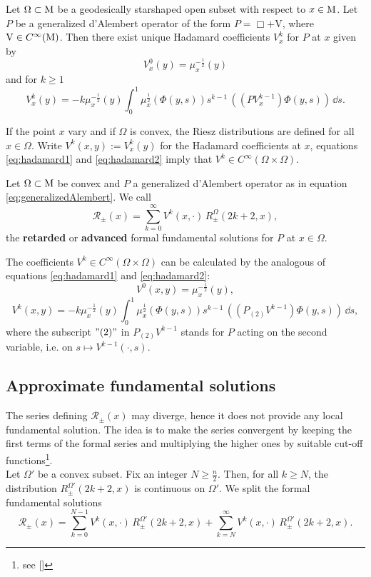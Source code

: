 \begin{theorem}
	Let $\Omega\subset\mathrm{M}$ be a geodesically starshaped open subset with respect to $x\in\mathrm{M}$. Let $P$ be a generalized d'Alembert operator of the form $P=\Box+\mathrm{V}$, where $\mathrm{V}\in C^\infty(\mathrm{M})$. Then there exist unique Hadamard coefficients $V_x^k$ for $P$ at $x$ given by
	\begin{equation}
		V_x^0(y)=\mu_x^{-\frac12}(y)
		\label{eq:hadamard1}
	\end{equation}	
	and for $k\geq 1$
	\begin{equation}
		V_x^k(y)=-k\mu_x^{-\frac12}(y)\int_{0}^{1}\mu_x^{\frac12}\left(\Phi(y,s)\right)s^{k-1}\,\left((PV_x^{k-1})\Phi(y,s)\right)\,\dd s.
		\label{eq:hadamard2}	
	\end{equation}		
\end{theorem}


\noindent If the point $x$ vary and if $\Omega$ is convex, the Riesz distributions are defined for all $x\in\Omega$. Write $V^k (x, y) := V_x^k (y)$ for the Hadamard coefficients at $x$, equations \eqref{eq:hadamard1} and \eqref{eq:hadamard2} imply that $V^k\in C^\infty(\Omega\times\Omega)$.

\begin{definition}
	Let $\Omega\subset\mathrm{M}$ be convex and $P$ a generalized d'Alembert operator as in equation \eqref{eq:generalizedAlembert}. We call \begin{equation}
		\mathcal{R}_\pm(x)=\sum_{k=0}^{\infty} V^k(x,\cdot)\, R_\pm^\Omega(2k+2,x),
	\end{equation} the \textbf{retarded} or \textbf{advanced} formal fundamental solutions for $P$ at $x\in\Omega$.
\end{definition}
\begin{rem}
	The coefficients $V^k\in C^\infty(\Omega\times\Omega)$ can be calculated by the analogous of equations \eqref{eq:hadamard1} and \eqref{eq:hadamard2}:
	\[		V^0(x,y)=\mu_x^{-\frac12}(y),		\]
	\[		V^k(x,y)=-k\mu_x^{-\frac12}(y)\int_{0}^{1}\mu_x^{\frac12}\left(\Phi(y,s)\right)s^{k-1}\,\left((P_{(2)}V^{k-1})\Phi(y,s)\right)\,\dd s,		\]
	where the subscript $"(2)"$ in $P_{(2)}V^{k-1}$ stands for $P$ acting on the second variable, i.e. on $s\mapsto V^{k-1}(\cdot,s)$.
\end{rem}


\subsection{Approximate fundamental solutions}
The series defining $\mathcal{R}_\pm(x)$ may diverge, hence it does not provide any local fundamental solution. The idea is to make the series convergent by keeping the first terms of the formal series and multiplying the higher ones by suitable cut-off functions\footnote{see [\citealp[Lem 2.2.6]{bar2}]}.\\
Let $\Omega'$ be a convex subset. Fix an integer $N\geq \frac{n}2$. Then, for all $k\geq N$, the distribution $R_\pm^{\Omega'}(2k+2,x)$ is continuous on $\Omega'$. We split the formal fundamental solutions
\[		\mathcal{R}_\pm(x)=\sum_{k=0}^{N-1} V^k(x,\cdot)\, R_\pm^{\Omega'}(2k+2,x)	+\sum_{k=N}^{\infty} V^k(x,\cdot)\, R_\pm^{\Omega'}(2k+2,x).	\]

